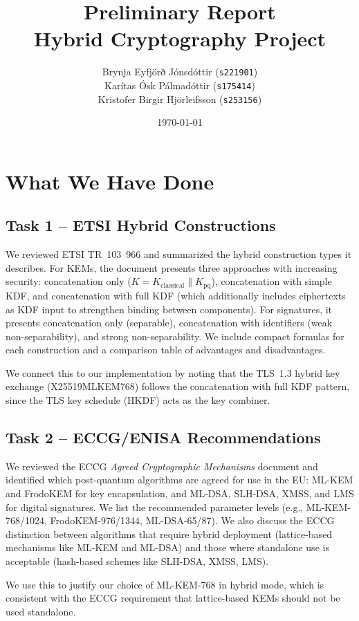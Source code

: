 \documentclass[11pt,a4paper]{article}
\title{Preliminary Report \\ Hybrid Cryptography Project}
\author{
    Brynja Eyfjörð Jónsdóttir (\texttt{s221901}) \\
    Karítas Ósk Pálmadóttir (\texttt{s175414}) \\
    Kristofer Birgir Hjörleifsson (\texttt{s253156})
}
\date{\today}
\begin{document}
\maketitle

\section{What We Have Done}

\subsection*{Task 1 -- ETSI Hybrid Constructions}

We reviewed ETSI TR~103~966 and summarized the hybrid construction types it describes. For KEMs, the document presents three approaches with increasing security: concatenation only ($K = K_{\text{classical}} \parallel K_{\text{pq}}$), concatenation with simple KDF, and concatenation with full KDF (which additionally includes ciphertexts as KDF input to strengthen binding between components). For signatures, it presents concatenation only (separable), concatenation with identifiers (weak non-separability), and strong non-separability. We include compact formulas for each construction and a comparison table of advantages and disadvantages.

We connect this to our implementation by noting that the TLS~1.3 hybrid key exchange (X25519MLKEM768) follows the concatenation with full KDF pattern, since the TLS key schedule (HKDF) acts as the key combiner.

\subsection*{Task 2 -- ECCG/ENISA Recommendations}

We reviewed the ECCG \emph{Agreed Cryptographic Mechanisms} document and identified which post-quantum algorithms are agreed for use in the EU: ML-KEM and FrodoKEM for key encapsulation, and ML-DSA, SLH-DSA, XMSS, and LMS for digital signatures. We list the recommended parameter levels (e.g., ML-KEM-768/1024, FrodoKEM-976/1344, ML-DSA-65/87). We also discuss the ECCG distinction between algorithms that require hybrid deployment (lattice-based mechanisms like ML-KEM and ML-DSA) and those where standalone use is acceptable (hash-based schemes like SLH-DSA, XMSS, LMS).

We use this to justify our choice of ML-KEM-768 in hybrid mode, which is consistent with the ECCG requirement that lattice-based KEMs should not be used standalone.
\end{document}
